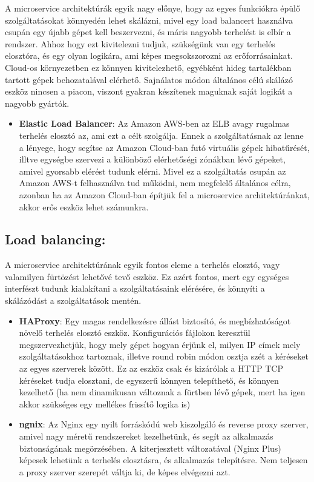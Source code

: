 \documentclass[11pt,magyar,a4paper,oneside,]{report}
\begin{document}
A microservice architektúrák egyik nagy előnye, hogy az egyes funkciókra
épülő szolgáltatásokat könnyedén lehet skálázni, mivel egy load
balancert használva csupán egy újabb gépet kell beszervezni, és máris
nagyobb terhelést is elbír a rendszer. Ahhoz hogy ezt kivitelezni
tudjuk, szükségünk van egy terhelés elosztóra, és egy olyan logikára,
ami képes megsokszorozni az erőforrásainkat. Cloud-os környezetben ez
könnyen kivitelezhető, egyébként hideg tartalékban tartott gépek
behozatalával elérhető. Sajnálatos módon általános célú skálázó eszköz
nincsen a piacon, viszont gyakran készítenek maguknak saját logikát a
nagyobb gyártók.

\begin{itemize}
\itemsep1pt\parskip0pt
\item
  \textbf{Elastic Load Balancer}: Az Amazon AWS-ben az ELB avagy
  rugalmas terhelés elosztó az, ami ezt a célt szolgálja. Ennek a
  szolgáltatásnak az lenne a lényege, hogy segítse az Amazon Cloud-ban
  futó virtuális gépek hibatűrését, illtve egységbe szervezi a különböző
  elérhetőségi zónákban lévő gépeket, amivel gyorsabb elérést tudunk
  elérni. Mivel ez a szolgáltatás csupán az Amazon AWS-t felhasználva
  tud működni, nem megfelelő általános célra, azonban ha az Amazon
  Cloud-ban építjük fel a microservice architektúránkat, akkor erős
  eszköz lehet számunkra.
\end{itemize}

\subsection{Load balancing:}\label{load-balancing}

A microservice architektúrának egyik fontos eleme a terhelés elosztó,
vagy valamilyen fürtözést lehetővé tevő eszköz. Ez azért fontos, mert
egy egységes interfészt tudunk kialakítani a szolgáltatásaink elérésére,
és könnyíti a skálázódást a szolgáltatások mentén.

\begin{itemize}
\item
  \textbf{HAProxy}: Egy magas rendelkezésre állást biztosító, és
  megbízhatóságot növelő terhelés elosztó eszköz. Konfigurációs fájlokon
  keresztül megszervezhetjük, hogy mely gépet hogyan érjünk el, milyen
  IP címek mely szolgáltatásokhoz tartoznak, illetve round robin módon
  osztja szét a kéréseket az egyes szerverek között. Ez az eszköz csak
  és kizárólak a HTTP TCP kéréseket tudja elosztani, de egyszerű könnyen
  telepíthető, és könnyen kezelhető (ha nem dinamikusan változnak a
  fürtben lévő gépek, mert ha igen akkor szükséges egy mellékes frissítő
  logika is)
\item
  \textbf{ngnix}: Az Nginx egy nyilt forráskódú web kiszolgáló és
  reverse proxy szerver, amivel nagy méretű rendszereket kezelhetünk, és
  segít az alkalmazás biztonságának megörzésében. A kiterjesztett
  változatával (Nginx Plus) képesek lehetünk a terhelés elosztásra, és
  alkalmazás telepítésre. Nem teljesen a proxy szerver szerepét váltja
  ki, de képes elvégezni azt.
\end{itemize}
\end{document}
